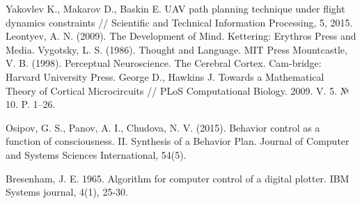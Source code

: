 \documentclass[runningheads,a4paper]{llncs}
\begin{document}
\begin{thebibliography}{4}
 Yakovlev K., Makarov D., Baskin E. UAV path planning technique under flight dynamics constraints // Scientific and Technical Information Processing, 5, 2015.
 Leontyev, A. N. (2009). The Development of Mind. Kettering: Erythros Press and Media.
 Vygotsky, L. S. (1986). Thought and Language. MIT Press
 Mountcastle, V. B. (1998). Perceptual Neuroscience. The Cerebral Cortex. Cam-bridge: Harvard University Press.
 George D., Hawkins J. Towards a Mathematical Theory of Cortical Microcircuits // PLoS Computational Biology. 2009. V. 5. № 10. P. 1–26.

 Osipov, G. S., Panov, A. I., Chudova, N. V. (2015). Behavior control as a function of consciousness. II. Synthesis of a Behavior Plan. Journal of Computer and Systems Sciences International, 54(5).

 Bresenham, J. E. 1965. Algorithm for computer control of a digital plotter. IBM Systems journal, 4(1), 25-30.

\end{thebibliography}
\end{document}
